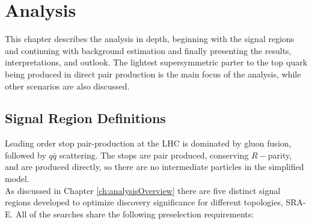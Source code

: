 \chapter{Analysis}
\label{ch:analysis}



This chapter describes the analysis in depth, beginning with the signal regions and continuing with background estimation and finally presenting the results, interpretations, and outlook.  The lightest supersymmetric parter to the top quark being produced in direct pair production is the main focus of the analysis, while other scenarios are also discussed.  




\section{Signal Region Definitions}
\label{sec:srDefs}

Leading order stop pair-production at the LHC is dominated by gluon fusion, followed by $q\bar{q}$ scattering.  The stops are pair produced, conserving $R-$parity, and are produced directly, so there are no intermediate particles in the simplified model.  \\

As discussed in Chapter \ref{ch:analysisOverview} there are five distinct signal regions developed to optimize discovery significance for different topologies, SRA-E.  All of the searches share the following preselection requirements:

